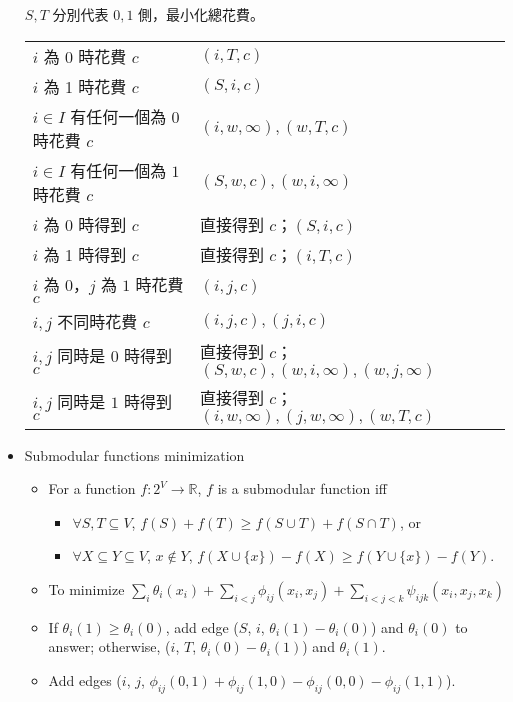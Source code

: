 \begin{itemize}
      $S, T$ 分別代表 $0, 1$ 側，最小化總花費。
      \begin{tabular}{|l|l|}
        $i$ 為 0 時花費 $c$ & $(i, T, c)$ \\
        $i$ 為 1 時花費 $c$ & $(S, i, c)$ \\
        $i \in I$ 有任何一個為 $0$ 時花費 $c$ & $(i, w, \infty), (w, T, c)$ \\
        $i \in I$ 有任何一個為 $1$ 時花費 $c$ & $(S, w, c), (w, i, \infty)$ \\
        $i$ 為 0 時得到 $c$ & 直接得到 $c$；$(S, i, c)$ \\
        $i$ 為 1 時得到 $c$ & 直接得到 $c$；$(i, T, c)$ \\
        $i$ 為 0，$j$ 為 $1$ 時花費 $c$ & $(i, j, c)$ \\
        $i, j$ 不同時花費 $c$ & $(i, j, c), (j, i, c)$ \\
        $i, j$ 同時是 $0$ 時得到 $c$ & 直接得到 $c$；$(S, w, c), (w, i, \infty), (w, j, \infty)$ \\
        $i, j$ 同時是 $1$ 時得到 $c$ & 直接得到 $c$；$(i, w, \infty), (j, w, \infty), (w, T, c)$ \\
      \end{tabular}
    \item Submodular functions minimization
      \begin{itemize}
        \item For a function $f: 2^V \to \mathbb{R}$, $f$ is a submodular function iff
          \begin{itemize}
            \item $\forall S,T \subseteq V$, $f(S) + f(T) \geq f(S \cup T) + f(S \cap T)$, or
            \item $\forall X \subseteq Y \subseteq V$, $x\notin Y$, $f(X\cup\{x\})-f(X)\geq f(Y\cup\{x\})-f(Y)$.
          \end{itemize}
        \item To minimize $\sum_i \theta_i (x_i) + \sum_{i< j} \phi_{ij} (x_i, x_j) + \sum_{i< j< k}  \psi_{ijk} (x_i, x_j, x_k)$
        \item If $\theta_i(1)\geq\theta_i(0)$, add edge ($S$, $i$, $\theta_i(1)-\theta_i(0)$) and $\theta_i(0)$ to answer; otherwise, ($i$, $T$, $\theta_i(0)-\theta_i(1)$) and $\theta_i(1)$.
        \item Add edges ($i$, $j$, $\phi_{ij}(0,1)+\phi_{ij}(1,0)-\phi_{ij}(0,0)-\phi_{ij}(1,1)$).

\end{itemize}
\end{itemize}
